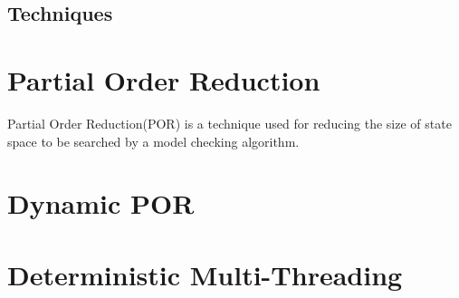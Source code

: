 \subsection{Techniques \label{model_check_techniques}}
\section{Partial Order Reduction}

Partial Order Reduction(POR) is a technique used for reducing the size of state space to be searched by a model checking algorithm\cite{por10yrs}. 


\section{Dynamic POR}

\section{Deterministic Multi-Threading}

%
